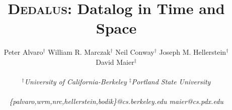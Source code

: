 \documentclass{sig-alternate}
\def\lang{\textsc{Dedalus}\xspace}
\begin{document}
\title{{\huge{\bf\lang}}:
Datalog in Time and Space} 
%


\author{
%
Peter Alvaro$^\dagger$ \quad William R. Marczak$^\dagger$ \quad Neil
Conway$^\dagger$ \quad Joseph M. Hellerstein$^\dagger$ \quad \\
%
David Maier$^\ddagger$\\\\
%
\fontsize{10}{10}\selectfont\itshape 
$^\dagger$University of California-Berkeley \quad $^\ddagger$Portland State
University\\\\ \fontsize{9}{9}\selectfont\ttfamily\upshape
%
\{palvaro,wrm,nrc,hellerstein,bodik\}@cs.berkeley.edu \quad maier@cs.pdx.edu
%
}

\maketitle
\end{document}
